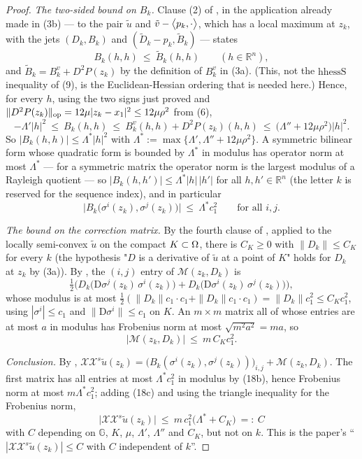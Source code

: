 \begin{proof}
\emph{The two-sided bound on $B_k$.} Clause (2) of , in the
application already made in (3b) --- to the pair $\tilde u$ and
$\tilde v-\big\langle p_k,\cdot\big\rangle$, which has a local maximum at $z_k$, with the jets $(D_k,B_k)$
and $(\tilde D_k-p_k,\tilde B_k)$ --- states
\[
 B_k(h,h)\ \le\ \tilde B_k(h,h)\qquad(h\in\mathbb R^{n}),
\]
and $\tilde B_k=B^{v}_k+D^{2}P(z_k)$ by the definition of $B^{v}_k$ in (3a). (This, not the
$\mathrm{hhessS}$ inequality of (9), is the Euclidean-Hessian ordering that is needed here.)
Hence, for every $h$, using the two signs just proved and
$\|D^{2}P(z_k)\|_{\rm op}=12\mu|z_k-x_1|^{2}\le12\mu\rho^{2}$ from (6),
\[
 -\Lambda'|h|^{2}\ \le\ B_k(h,h)\ \le\ B^{v}_k(h,h)+D^{2}P(z_k)(h,h)
 \ \le\ \big(\Lambda''+12\mu\rho^{2}\big)|h|^{2} .
\]
So $|B_k(h,h)|\le\Lambda^{*}|h|^{2}$ with
$\Lambda^{*}:=\max\{\Lambda',\Lambda''+12\mu\rho^{2}\}$. A symmetric bilinear form whose
quadratic form is bounded by $\Lambda^{*}$ in modulus has operator norm at most
$\Lambda^{*}$ --- for a symmetric matrix the operator norm is the largest modulus of a
Rayleigh quotient --- so $|B_k(h,h')|\le\Lambda^{*}|h|\,|h'|$ for all $h,h'\in\mathbb R^{n}$
(the letter $k$ is reserved for the sequence index), and in particular
\[
 \big|B_k\big(\sigma^{i}(z_k),\sigma^{j}(z_k)\big)\big|\ \le\ \Lambda^{*}c_1^{2}
 \qquad\text{for all }i,j . \tag{18b}
\]

\emph{The bound on the correction matrix.} By the fourth clause of
, applied to the locally semi-convex $\tilde u$ on the
compact $K\subset\Omega$, there is $C_K\ge0$ with $\|D_k\|\le C_K$ for every $k$ (the
hypothesis "$D$ is a derivative of $\tilde u$ at a point of $K$" holds for $D_k$ at $z_k$ by
(3a)). By , the $(i,j)$ entry of $\mathcal M(z_k,D_k)$ is
\[
 \tfrac12\Big(D_k\big(\mathrm D\sigma^{j}(z_k)\,\sigma^{i}(z_k)\big)
 +D_k\big(\mathrm D\sigma^{i}(z_k)\,\sigma^{j}(z_k)\big)\Big),
\]
whose modulus is at most $\frac12(\|D_k\|c_1\cdot c_1+\|D_k\|c_1\cdot c_1)=\|D_k\|c_1^{2}
\le C_Kc_1^{2}$, using $|\sigma^{i}|\le c_1$ and $\|\mathrm D\sigma^{i}\|\le c_1$ on $K$.
An $m\times m$ matrix all of whose entries are at most $a$ in modulus has Frobenius norm at
most $\sqrt{m^{2}a^{2}}=ma$, so
\[
 \big|\mathcal M(z_k,D_k)\big|\ \le\ m\,C_Kc_1^{2} . \tag{18c}
\]

\emph{Conclusion.} By ,
$\mathcal X\mathcal X^{s}\tilde u(z_k)=\big(B_k(\sigma^{i}(z_k),\sigma^{j}(z_k))\big)_{i,j}
+\mathcal M(z_k,D_k)$. The first matrix has all entries at most $\Lambda^{*}c_1^{2}$ in
modulus by (18b), hence Frobenius norm at most $m\Lambda^{*}c_1^{2}$; adding (18c) and using
the triangle inequality for the Frobenius norm,
\[
 \big|\mathcal X\mathcal X^{s}\tilde u(z_k)\big|\ \le\
 m\,c_1^{2}\big(\Lambda^{*}+C_K\big)\ =:\ C \tag{18}
\]
with $C$ depending on $\mathbb G$, $K$, $\mu$, $\Lambda'$, $\Lambda''$ and $C_K$, but not
on $k$. This is the paper's ``$|\mathcal X\mathcal X^{s}\tilde u(z_k)|\le C$ with $C$
independent of $k$''.


\end{proof}
